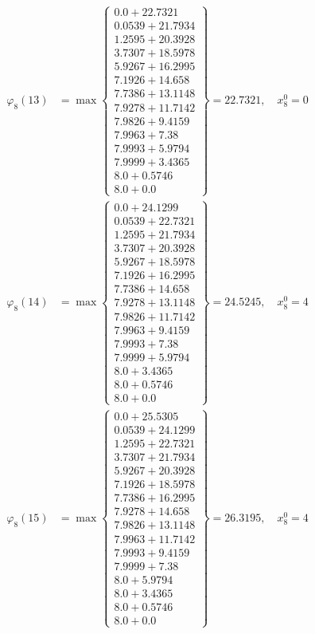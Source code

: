 \documentclass{article}
\begin{document}
\begin{align*}
\varphi_{8}(13) &= \max \left\{ \begin{array}{c}
0.0 + 22.7321 \\
 0.0539 + 21.7934 \\
 1.2595 + 20.3928 \\
 3.7307 + 18.5978 \\
 5.9267 + 16.2995 \\
 7.1926 + 14.658 \\
 7.7386 + 13.1148 \\
 7.9278 + 11.7142 \\
 7.9826 + 9.4159 \\
 7.9963 + 7.38 \\
 7.9993 + 5.9794 \\
 7.9999 + 3.4365 \\
 8.0 + 0.5746 \\
 8.0 + 0.0
\end{array} \right\}=22.7321, \quad x_{8}^0=0\\
  
\varphi_{8}(14) &= \max \left\{ \begin{array}{c}
0.0 + 24.1299 \\
 0.0539 + 22.7321 \\
 1.2595 + 21.7934 \\
 3.7307 + 20.3928 \\
 5.9267 + 18.5978 \\
 7.1926 + 16.2995 \\
 7.7386 + 14.658 \\
 7.9278 + 13.1148 \\
 7.9826 + 11.7142 \\
 7.9963 + 9.4159 \\
 7.9993 + 7.38 \\
 7.9999 + 5.9794 \\
 8.0 + 3.4365 \\
 8.0 + 0.5746 \\
 8.0 + 0.0
\end{array} \right\}=24.5245, \quad x_{8}^0=4\\
  
\varphi_{8}(15) &= \max \left\{ \begin{array}{c}
0.0 + 25.5305 \\
 0.0539 + 24.1299 \\
 1.2595 + 22.7321 \\
 3.7307 + 21.7934 \\
 5.9267 + 20.3928 \\
 7.1926 + 18.5978 \\
 7.7386 + 16.2995 \\
 7.9278 + 14.658 \\
 7.9826 + 13.1148 \\
 7.9963 + 11.7142 \\
 7.9993 + 9.4159 \\
 7.9999 + 7.38 \\
 8.0 + 5.9794 \\
 8.0 + 3.4365 \\
 8.0 + 0.5746 \\
 8.0 + 0.0
\end{array} \right\}=26.3195, \quad x_{8}^0=4\\
  

\end{align*}
\end{document}
